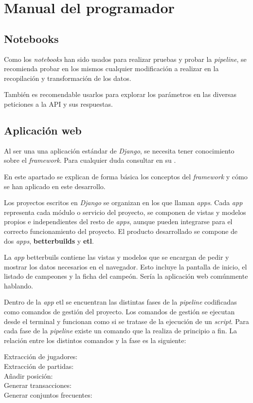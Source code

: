 \section{Manual del programador}
\subsection{Notebooks}
Como los \textit{notebooks} han sido usados para realizar pruebas y probar la \textit{pipeline}, se recomienda probar en los mismos cualquier modificación a realizar en la recopilación y transformación de los datos.

También es recomendable usarlos para explorar los parámetros en las diversas peticiones a la API y sus respuestas.

\subsection{Aplicación web}
Al ser una una aplicación estándar de \textit{Django}, se necesita tener conocimiento sobre el \textit{framework}. Para cualquier duda consultar en su .

En este apartado se explican de forma básica los conceptos del \textit{framework} y cómo se han aplicado en este desarrollo.

Los proyectos escritos en \textit{Django} se organizan en los que llaman \textit{apps}. Cada \textit{app} representa cada módulo o servicio del proyecto, se componen de vistas y modelos propios e independientes del resto de \textit{apps}, aunque pueden integrarse para el correcto funcionamiento del proyecto. El producto desarrollado se compone de dos \textit{apps}, \textbf{betterbuilds} y \textbf{etl}.

La \textit{app} betterbuils contiene las vistas y modelos que se encargan de pedir y mostrar los datos necesarios en el navegador. Esto incluye la pantalla de inicio, el listado de campeones y la ficha del campeón. Sería la aplicación web comúnmente hablando.

Dentro de la \textit{app} etl se encuentran las distintas fases de la \textit{pipeline} codificadas como comandos de gestión del proyecto. Los comandos de gestión se ejecutan desde el terminal y funcionan como si se tratase de la ejecución de un \textit{script}. Para cada fase de la \textit{pipeline} existe un comando que la realiza de principio a fin. La relación entre los distintos comandos y la fase es la siguiente:
\begin{description}
	\item[Extracción de jugadores:] 
	\item[Extracción de partidas:] 
	\item[Añadir posición:] 
	\item[Generar transacciones:] 
	\item[Generar conjuntos frecuentes:] 
\end{description}

